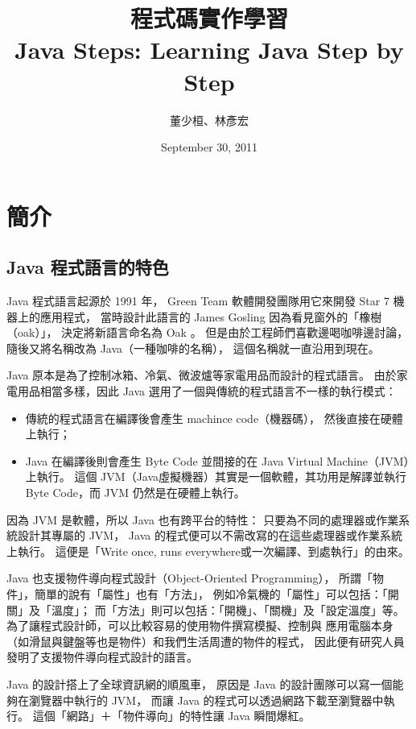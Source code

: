 \documentclass[a4paper,12pt,english]{sphinxmanual}
\title{程式碼實作學習\\Java Steps: Learning Java Step by Step}
\date{September 30, 2011}
\author{董少桓、林彥宏}
\begin{document}
\maketitle
\tableofcontents
{}\label{index::doc}



\chapter{簡介}
\label{java_intro::doc}\label{java_intro:java-steps}\label{java_intro:id1}

\section{Java 程式語言的特色}
\label{java_intro:java}
Java 程式語言起源於 1991 年，
Green Team 軟體開發團隊用它來開發 Star 7 機器上的應用程式，
當時設計此語言的 James Gosling 因為看見窗外的「橡樹（oak）」，
決定將新語言命名為 Oak 。
但是由於工程師們喜歡邊喝咖啡邊討論，
隨後又將名稱改為 Java（一種咖啡的名稱），
這個名稱就一直沿用到現在。

Java 原本是為了控制冰箱、冷氣、微波爐等家電用品而設計的程式語言。
由於家電用品相當多樣，因此 Java 選用了一個與傳統的程式語言不一樣的執行模式：
\begin{itemize}
\item {} 
傳統的程式語言在編譯後會產生 machince code（機器碼），
然後直接在硬體上執行；

\item {} 
Java 在編譯後則會產生 Byte Code 並間接的在 Java Virtual Machine（JVM）上執行。
這個 JVM（Java虛擬機器）其實是一個軟體，其功用是解譯並執行 Byte Code，而 JVM 仍然是在硬體上執行。

\end{itemize}

因為 JVM 是軟體，所以 Java 也有跨平台的特性：
只要為不同的處理器或作業系統設計其專屬的 JVM，
Java 的程式便可以不需改寫的在這些處理器或作業系統上執行。
這便是「Write once, runs everywhere或一次編譯、到處執行」的由來。

Java 也支援物件導向程式設計（Object-Oriented Programming），
所謂「物件」，簡單的說有「屬性」也有「方法」，
例如冷氣機的「屬性」可以包括：「開關」及「溫度」；
而「方法」則可以包括：「開機」、「關機」及「設定溫度」等。
為了讓程式設計師，可以比較容易的使用物件撰寫模擬、控制與
應用電腦本身（如滑鼠與鍵盤等也是物件）和我們生活周遭的物件的程式，
因此便有研究人員發明了支援物件導向程式設計的語言。

Java 的設計搭上了全球資訊網的順風車，
原因是 Java 的設計團隊可以寫一個能夠在瀏覽器中執行的 JVM，
而讓 Java 的程式可以透過網路下載至瀏覽器中執行。
這個「網路」＋「物件導向」的特性讓 Java 瞬間爆紅。
\end{document}
